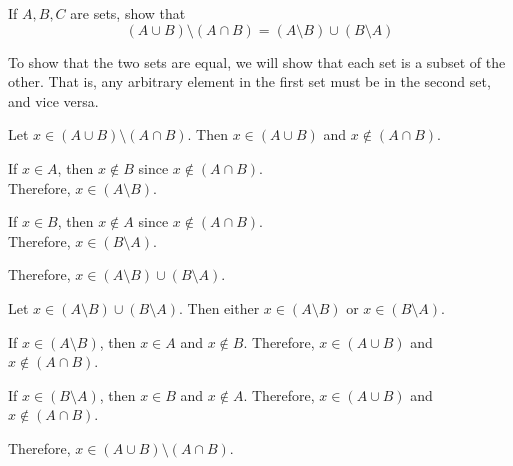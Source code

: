 \begin{problem}
  If $A, B, C$ are sets, show that
  \[ (A \cup B) \setminus (A \cap B) = (A \setminus B) \cup (B \setminus A) \]
\end{problem}

\begin{answer}
  To show that the two sets are equal, we will show that each set is a subset
  of the other. That is, any arbitrary element in the first set must be in
  the second set, and vice versa.

  \begin{enumroman}
    \item Let $x \in (A \cup B) \setminus (A \cap B)$. Then $x \in (A \cup B)$
      and $x \notin (A \cap B)$.
      \begin{enumarabic}
        \item If $x \in A$, then $x \not \in B$ since $x \not \in (A \cap B)$. \\
          Therefore, $x \in (A \setminus B)$.
        \item If $x \in B$, then $x \not \in A$ since $x \not \in (A \cap B)$. \\
          Therefore, $x \in (B \setminus A)$.
      \end{enumarabic}
      Therefore, $x \in (A \setminus B) \cup (B \setminus A)$.

    \item Let $x \in (A \setminus B) \cup (B \setminus A)$. Then either $x \in (A \setminus B)$
      or $x \in (B \setminus A)$.
      \begin{enumarabic}
        \item If $x \in (A \setminus B)$, then $x \in A$ and $x \notin B$.
          Therefore, $x \in (A \cup B)$ and $x \notin (A \cap B)$.
        \item If $x \in (B \setminus A)$, then $x \in B$ and $x \notin A$.
          Therefore, $x \in (A \cup B)$ and $x \notin (A \cap B)$.
      \end{enumarabic}
      Therefore, $x \in (A \cup B) \setminus (A \cap B)$.
  \end{enumroman}
\end{answer}
